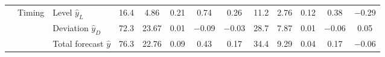 \begin{table}[htbp]
{\begin{adjustbox}{max width=\linewidth, max totalheight=0.75\textheight}
\begin{tabular}{lllcccccccccc}
 & Timing & Level $\hat y_L$ & 16.4 & \phantom{0}4.86 & 0.21 & \phantom{$-$}0.74 & \phantom{$-$}0.26 & \phantom{$-$}11.2 & \phantom{$-$}2.76 & 0.12 & \phantom{$-$}0.38 & $-$0.29 \\
 &  & Deviation $\hat y_D$ & 72.3 & 23.67 & 0.01 & $-$0.09 & $-$0.03 & \phantom{$-$}28.7 & \phantom{$-$}7.87 & 0.01 & $-$0.06 & \phantom{$-$}0.05 \\
\cmidrule(lr){2-13}
 &  & Total forecast $\hat y$ & 76.3 & 22.76 & 0.09 & \phantom{$-$}0.43 & \phantom{$-$}0.17 & \phantom{$-$}34.4 & \phantom{$-$}9.29 & 0.04 & \phantom{$-$}0.17 & $-$0.06 \\
\bottomrule
\end{tabular}
\end{adjustbox}
}
\end{table}
